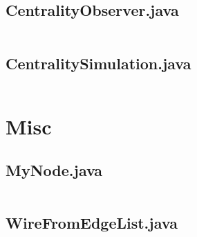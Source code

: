 \documentclass[a4paper, 10pt]{article}
\begin{document}
\subsection*{CentralityObserver.java}
\inputminted[firstline=16]{java}{../src/centrality/CentralityObserver.java}
\subsection*{CentralitySimulation.java}
\inputminted[firstline=14]{java}{../src/centrality/CentralitySimulation.java}

\section{Misc}

\subsection*{MyNode.java}
\inputminted[firstline=15]{java}{../src/centrality/MyNode.java}
\subsection*{WireFromEdgeList.java}
\inputminted[firstline=19]{java}{../src/centrality/WireFromEdgeList.java}
\end{document}
